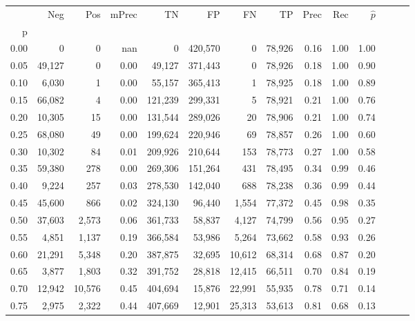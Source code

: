 \begin{tabular}{rrrrrrrrrrrrrr}
\toprule
{} &     Neg &     Pos & mPrec &       TN &       FP &      FN &      TP &  Prec &   Rec & $\hat{p}$ \\
p    &         &         &       &          &          &         &         &       &       &           \\
\midrule
0.00 &       0 &       0 &   nan &        0 &  420,570 &       0 &  78,926 &  0.16 &  1.00 &      1.00 \\
0.05 &  49,127 &       0 &  0.00 &   49,127 &  371,443 &       0 &  78,926 &  0.18 &  1.00 &      0.90 \\
0.10 &   6,030 &       1 &  0.00 &   55,157 &  365,413 &       1 &  78,925 &  0.18 &  1.00 &      0.89 \\
0.15 &  66,082 &       4 &  0.00 &  121,239 &  299,331 &       5 &  78,921 &  0.21 &  1.00 &      0.76 \\
0.20 &  10,305 &      15 &  0.00 &  131,544 &  289,026 &      20 &  78,906 &  0.21 &  1.00 &      0.74 \\
0.25 &  68,080 &      49 &  0.00 &  199,624 &  220,946 &      69 &  78,857 &  0.26 &  1.00 &      0.60 \\
0.30 &  10,302 &      84 &  0.01 &  209,926 &  210,644 &     153 &  78,773 &  0.27 &  1.00 &      0.58 \\
0.35 &  59,380 &     278 &  0.00 &  269,306 &  151,264 &     431 &  78,495 &  0.34 &  0.99 &      0.46 \\
0.40 &   9,224 &     257 &  0.03 &  278,530 &  142,040 &     688 &  78,238 &  0.36 &  0.99 &      0.44 \\
0.45 &  45,600 &     866 &  0.02 &  324,130 &   96,440 &   1,554 &  77,372 &  0.45 &  0.98 &      0.35 \\
0.50 &  37,603 &   2,573 &  0.06 &  361,733 &   58,837 &   4,127 &  74,799 &  0.56 &  0.95 &      0.27 \\
0.55 &   4,851 &   1,137 &  0.19 &  366,584 &   53,986 &   5,264 &  73,662 &  0.58 &  0.93 &      0.26 \\
0.60 &  21,291 &   5,348 &  0.20 &  387,875 &   32,695 &  10,612 &  68,314 &  0.68 &  0.87 &      0.20 \\
0.65 &   3,877 &   1,803 &  0.32 &  391,752 &   28,818 &  12,415 &  66,511 &  0.70 &  0.84 &      0.19 \\
0.70 &  12,942 &  10,576 &  0.45 &  404,694 &   15,876 &  22,991 &  55,935 &  0.78 &  0.71 &      0.14 \\
0.75 &   2,975 &   2,322 &  0.44 &  407,669 &   12,901 &  25,313 &  53,613 &  0.81 &  0.68 &      0.13 \\

\end{tabular}
